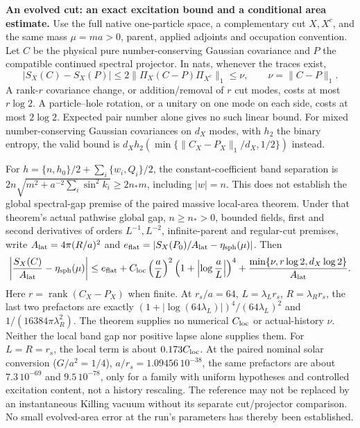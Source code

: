 \documentclass[10pt]{article}
\begin{document}
\setlength{\abovedisplayskip}{4pt}
\setlength{\belowdisplayskip}{4pt}
\noindent\textbf{An evolved cut: an exact excitation bound and a conditional area estimate.}
Use the full native one-particle space, a complementary cut $X,X^c$, and
the same mass $\mu=ma>0$, parent, applied adjoints and occupation convention.
Let $C$ be the physical pure number-conserving Gaussian covariance and $P$ the compatible
continued spectral projector. In nats, whenever the traces exist,
\[
 |S_X(C)-S_X(P)|\leq 2\|\Pi_X(C-P)\Pi_{X^c}\|_1
 \leq\nu,\qquad \nu=\|C-P\|_1.
\]
A rank-$r$ covariance change, or addition/removal of $r$ cut modes, costs
at most $r\log2$. A particle--hole rotation, or a unitary on one mode
on each side, costs at most $2\log2$. Expected pair number alone gives
no such linear bound.
For mixed number-conserving Gaussian covariances on $d_X$ modes, with $h_2$
the binary entropy, the valid bound is
$d_X h_2(\min\{\|C_X-P_X\|_1/d_X,1/2\})$ instead.

For $h=\{n,h_0\}/2+\sum_i\{w_i,Q_i\}/2$, the constant-coefficient
band separation is $2n\sqrt{m^2+a^{-2}\sum_i\sin^2k_i}\geq2n_*m$,
including $|w|=n$. This does not establish the global spectral-gap
premise of the paired massive local-area theorem. Under that theorem's
actual pathwise global gap, $n\geq n_*>0$, bounded fields, first and
second derivatives of orders $L^{-1},L^{-2}$, infinite-parent and regular-cut
premises, write $A_{\rm lat}=4\pi(R/a)^2$ and
$e_{\rm flat}=|S_X(P_0)/A_{\rm lat}-\eta_{\rm sph}(\mu)|$. Then
\[
 \left|\frac{S_X(C)}{A_{\rm lat}}-\eta_{\rm sph}(\mu)\right|
 \leq e_{\rm flat}
 +C_{\rm loc}\left(\frac aL\right)^2
       \left(1+\left|\log\frac aL\right|\right)^4
 +\frac{\min\{\nu,r\log2,d_X\log2\}}{A_{\rm lat}}.
\]
Here $r=\operatorname{rank}(C_X-P_X)$ when finite. At $r_s/a=64$,
$L=\lambda_Lr_s$, $R=\lambda_Rr_s$, the last two prefactors are exactly
$(1+|\log(64\lambda_L)|)^4/(64\lambda_L)^2$ and
$1/(16384\pi\lambda_R^2)$. The theorem supplies no numerical
$C_{\rm loc}$ or actual-history $\nu$. Neither the local band gap nor
positive lapse alone supplies them. For $L=R=r_s$, the local term is
about $0.173C_{\rm loc}$. At the paired nominal solar conversion ($G/a^2=1/4$),
$a/r_s=1.09456\,10^{-38}$, the same prefactors are about
$7.3\,10^{-69}$ and $9.5\,10^{-78}$, only for a family with uniform
hypotheses and controlled excitation content, not a history rescaling.
The reference may not be replaced by an instantaneous Killing vacuum
without its separate cut/projector comparison. No small evolved-area
error at the run's parameters has thereby been established.
\end{document}
